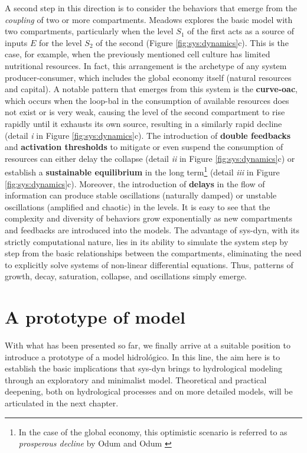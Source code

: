 \documentclass[./main_en.tex]{subfiles}
\begin{document}
\par A second step in this direction is to consider the behaviors that emerge from the \textit{coupling} of two or more compartments. Meadows explores the basic \gls{model} with two compartments, particularly when the level $S_1$ of the first acts as a source of inputs $E$ for the level $S_2$ of the second (Figure \ref{fig:sys:dynamics}c). This is the case, for example, when the previously mentioned cell culture has limited nutritional resources. In fact, this arrangement is the archetype of any \gls{system} producer-consumer, which includes the global economy itself (natural resources and capital). A notable pattern that emerges from this \gls{system} is the \textbf{\gls{curve-oac}}, which occurs when the \gls{loop-bal} in the consumption of available resources does not exist or is very weak, causing the level of the second compartment to rise rapidly until it exhausts its own source, resulting in a similarly rapid decline (detail \textrm{\textit{i}} in Figure \ref{fig:sys:dynamics}c). The introduction of \textbf{double feedbacks} and \textbf{activation thresholds} to mitigate or even suspend the consumption of resources can either delay the collapse (detail \textrm{\textit{ii}} in Figure \ref{fig:sys:dynamics}c) or establish a \textbf{sustainable equilibrium} in the long term\footnote{In the case of the global economy, this optimistic scenario is referred to as \textit{prosperous decline} by Odum and Odum \cite{odum2008}} (detail \textrm{\textit{iii}} in Figure \ref{fig:sys:dynamics}c). Moreover, the introduction of \textbf{delays} in the flow of information can produce stable oscillations (naturally damped) or unstable oscillations (amplified and chaotic) in the levels. It is easy to see that the complexity and diversity of behaviors grow exponentially as new compartments and feedbacks are introduced into the models. The advantage of \gls{sys-dyn}, with its strictly computational nature, lies in its ability to simulate the \gls{system} step by step from the basic relationships between the compartments, eliminating the need to explicitly solve systems of non-linear differential equations. Thus, patterns of growth, decay, saturation, collapse, and oscillations simply emerge.

\section{A prototype of model} \label{sec:systems:model}

\par With what has been presented so far, we finally arrive at a suitable position to introduce a prototype of a \gls{model} hidrológico. In this line, the aim here is to establish the basic implications that \gls{sys-dyn} brings to hydrological modeling through an exploratory and minimalist \gls{model}. Theoretical and practical deepening, both on hydrological processes and on more detailed models, will be articulated in the next chapter. 
\end{document}
